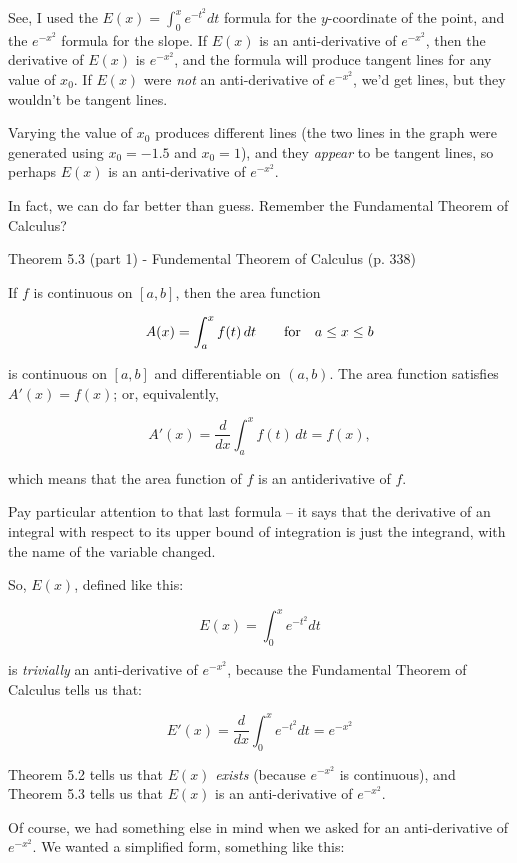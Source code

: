 See, I used the $E(x) = \int_0^x e^{-t^2} dt$ formula for the $y$-coordinate of the point,
and the $e^{-x^2}$ formula for the slope.
If $E(x)$ is an anti-derivative of $e^{-x^2}$, then the derivative of $E(x)$ is $e^{-x^2}$, and
the formula will produce tangent lines for any value of $x_0$.  If $E(x)$ were {\it not} an anti-derivative of $e^{-x^2}$,
we'd get lines, but they wouldn't be tangent lines.

Varying the value of $x_0$ produces different lines (the two lines in the graph were generated using $x_0 = -1.5$ and $x_0=1$),
and they {\it appear} to be tangent
lines, so perhaps $E(x)$ is an anti-derivative of $e^{-x^2}$.

In fact, we can do far better than guess.  Remember the Fundamental Theorem of Calculus?


\begin{framed}
\cite{briggs} Theorem 5.3 (part 1) - Fundemental Theorem of Calculus (p. 338)

If $f$ is continuous on $[a,b]$, then the area function

$$A(x) = \int_a^x f(t)\, dt \qquad {\rm for\quad} a \le x \le b$$

is continuous on $[a,b]$ and differentiable on $(a,b)$.  The area function satisfies $A'(x) = f(x)$; or, equivalently,

$$A'(x) = \frac{d}{dx} \int_a^x f(t)\, dt = f(x),$$

which means that the area function of $f$ is an antiderivative of $f$.
\end{framed}

Pay particular attention to that last formula -- it says that the derivative of an integral with respect
to its upper bound of integration is just the integrand, with the name of the variable changed.

So, $E(x)$, defined like this:

$$E(x) = \int_0^x e^{-t^2} dt$$

is {\it trivially} an anti-derivative of $e^{-x^2}$, because the Fundamental Theorem of Calculus tells us that:

$$E'(x) = \frac{d}{dx} \int_0^x e^{-t^2} dt = e^{-x^2}$$

\cite{briggs} Theorem 5.2 tells us that $E(x)$ {\it exists} (because $e^{-x^2}$ is continuous), and \cite{briggs} Theorem 5.3 tells
us that $E(x)$ is an anti-derivative of $e^{-x^2}$.

Of course, we had something else in mind when we asked for an anti-derivative of $e^{-x^2}$.  We wanted
a simplified form, something like this:

